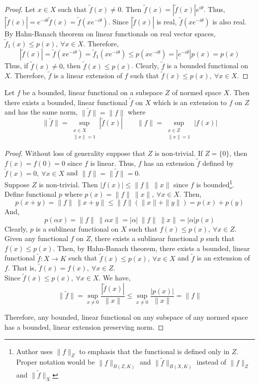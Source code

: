 \begin{proof}
	Let $x \in X$ such that $\tilde{f}(x) \ne 0$.
	Then $\tilde{f}(x) = |\tilde{f}(x)|e^{i\theta}$.
	Thus, $|\tilde{f}(x)| = e^{-i\theta}\tilde{f}(x) = \tilde{f}(xe^{-i\theta})$.
	Since $|\tilde{f}(x)|$ is real, $\tilde{f}(xe^{-i\theta})$ is also real.
	By Hahn-Banach theorem on linear functionals on real vector spaces, $\tilde{f}_1(x) \le p(x),\ \forall x \in X$.
	Therefore,
	\[ |\tilde{f}(x)| = \tilde{f}(xe^{-i\theta}) = \tilde{f}_1\left(xe^{-i\theta}\right) \le p\left(xe^{-i\theta}\right) = |e^{-i\theta}|p(x) = p(x) \]
	Thus, if $\tilde{f}(x) \ne 0$, then $\tilde{f}(x) \le p(x)$.
	Clearly, $\tilde{f}$ is a bounded functional on $X$.
	Therefore, $\tilde{f}$ is a linear extension of $f$ such that $\tilde{f}(x) \le p(x),\ \forall x \in X$.
\end{proof}

\begin{theorem}
	Let $f$ be a bounded, linear functional on a subspace $Z$ of normed space $X$.
	Then there exists a bounded, linear functional $\tilde{f}$ on $X$ which is an extension to $f$ on $Z$ and has the same norm, $\|\tilde{f}\| = \|f\|$ where 
	\[ \|\tilde{f}\| = \sup_{\substack{x \in X\\ \|x\|=1}} |\tilde{f}(x)| \qquad \|f\| = \sup_{\substack{x \in Z\\\|x\| = 1}} |f(x)| \]
\end{theorem}
\begin{proof}
	Without loss of generality suppose that $Z$ is non-trivial.
	If $Z = \{ 0 \}$, then $f(x) = f(0) = 0$ since $f$ is linear.
	Thus, $f$ has an extension $\tilde{f}$ defined by $\tilde{f}(x) = 0,\ \forall x \in X$ and $\|f\| = \|\tilde{f}\| = 0$.\\
	
	Suppose $Z$ is non-trivial.
	Then $|f(x)| \le \|f\| \ \|x\|$ since $f$ is bounded\dag\footnote{
		Author uses $\|f\|_Z$ to emphasis that the functional is defined only in $Z$.
		Proper notation would be $\|f\|_{B(Z,K)}$ and $\| \tilde{f}\|_{B(X,K)}$ instead of $\|f\|_Z$ and $\|\tilde{f}\|_X$}.
	Define functional $p$ where $p(x) = \|f\| \ \|x\|,\ \forall x \in X$.
	Then,
	\[ p(x+y) = \|f\| \ \|x+y\| \le \|f\| (\|x\|+\|y\|) = p(x) + p(y) \]
	And,
	\[ p(\alpha x) = \|f\| \ \|\alpha x\| = |\alpha| \ \|f\| \ \|x\| = |\alpha| p(x) \]
	Clearly, $p$ is a sublinear functional on $X$ such that $f(x) \le p(x),\ \forall x \in Z$. \\

	Given any functional $f$ on $Z$, there exists a sublinear functional $p$ such that $f(x) \le p(x)$.
	Then, by Hahn-Banach theorem, there exists a bounded, linear functional $\tilde{f} : X \to K$ such that $\tilde{f}(x) \le p(x),\ \forall x \in X$ and $\tilde{f}$ is an extension of $f$.
	That is, $\tilde{f}(x) = f(x),\ \forall x \in Z$.\\
	
	Since $\tilde{f}(x) \le p(x), \ \forall x \in X$.
	We have, \[ \|\tilde{f}\| = \sup_{x \ne 0} \frac{|\tilde{f}(x)|}{\|x\|} \le \sup_{x \ne 0} \frac{|p(x)|}{\|x\|} = \|f\| \]

	Therefore, any bounded, linear functional on any subspace of any normed space has a bounded, linear extension preserving norm.
\end{proof}

